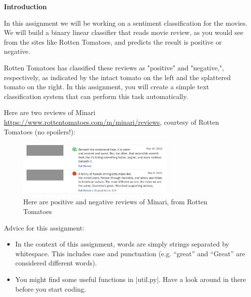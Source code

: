 {\bf Introduction}

In this assignment we will be working on a sentiment classification for the movies. We will build a binary linear classifier that reads movie review, as you would see from the sites like Rotten Tomatoes, and predicts the result is positive or negative.

Rotten Tomatoes has classified these reviews as "positive" and "negative,", respectively, as indicated by the intact tomato on the left and the splattered tomato on the right. In this assignment, you will create a simple text classification system that can perform this task automatically.

Here are two reviews of Minari \url{https://www.rottentomatoes.com/m/minari/reviews}, courtesy of Rotten Tomatoes (no spoilers!):


\begin{figure}[h]
    \begin{center}
        \captionsetup{width=0.8\textwidth}
        \includegraphics[width=0.7\textwidth]{images/minari.png}
        \caption{Here are positive and negative reviews of Minari, from Rotten Tomatoes}
        \label{rotton_tomatoespos}
    \end{center}
\end{figure}


Advice for this assignment:
\begin{itemize}
  \item In the context of this assignment, words are simply strings separated
  by whitespace. This includes case and punctuation (e.g. ``great'' and
  ``Great'' are considered different words).
  \item You might find some useful functions in |util.py|.  Have a look
  around in there before you start coding.
\end{itemize}
